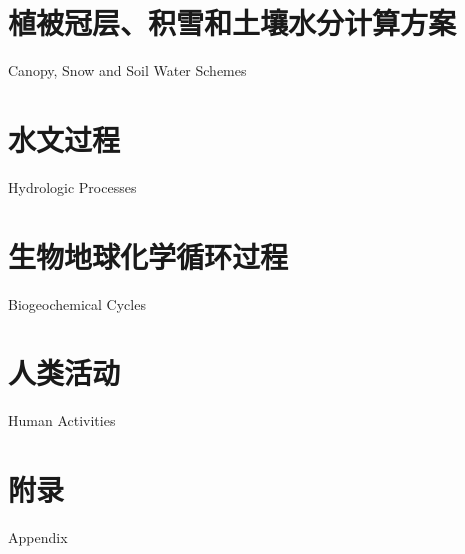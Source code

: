 \documentclass[a4paper,12pt,twoside]{report}
\begin{document}
\part{植被冠层、积雪和土壤水分计算方案}{Canopy, Snow and Soil Water Schemes}\label{part:SPC}




\part{水文过程}{Hydrologic Processes}\label{part:hydro}

%





\part{生物地球化学循环过程}{Biogeochemical Cycles}\label{part:BGC}






\part{人类活动}{Human Activities}\label{part:human}





\clearpage
{} %
\part*{附录}{Appendix}

\appendix
\clearpage



\clearpage



%
\end{document}
